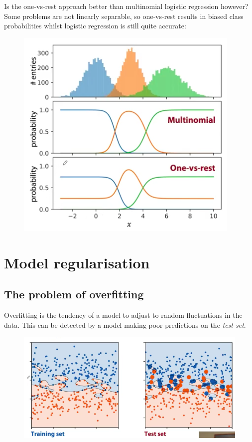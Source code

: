 Is the one-vs-rest approach better than multinomial logistic regression however? Some problems are not linearly separable, so one-vs-rest results in biased class probabilities whilst logistic regression is still quite accurate:
\begin{figure}[H]
\centering
\includegraphics[scale=0.6]{logisticvsonevsrest.png}
\end{figure}





\newpage
\section{Model regularisation}

\subsection{The problem of overfitting}
Overfitting is the tendency of a model to adjust to random fluctuations in the data. This can be detected by a model making poor predictions on the \textit{test set}.

\begin{figure}[H]
\centering
\includegraphics[scale=0.4]{overfitting.png}
\end{figure}

